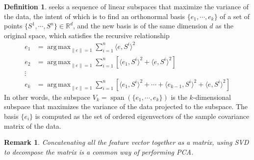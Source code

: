 \documentclass[a4paper]{article}
\theoremstyle{definition}
\newtheorem{definition}{Definition}
\theoremstyle{plain}
\newtheorem{remark}{Remark}
\DeclareMathOperator*{\argmax}{arg\,max}
\begin{document}
\begin{definition}
 seeks a sequence of linear subspaces that maximize the variance of the data, the intent of which is to find an orthonormal basis $\{e_1,\cdots,e_k\}$ of a set of points $\{S^1,\cdots,S^n\}\in\mathbb{R}^d$, and the new basis is of the same dimension $d$ as the original space, which satisfies the recursive relationship
\begin{align*}
    e_1&=\argmax_{\|e\|=1}\sum^n_{i=1}\langle e,S^i\rangle^2\\
    e_2&=\argmax_{\|e\|=1}\sum^n_{i=1}[\langle e_1,S^i\rangle^2+\langle e,S^i\rangle^2]\\
    \vdots\\
    e_k&=\argmax_{\|e\|=1}\sum^n_{i=1}[\langle e_1,S^i\rangle^2+\cdots+\langle e_{k-1},S^i\rangle^2+\langle e,S^i\rangle^2]
\end{align*}
In other words, the subspace $V_k=\operatorname{span}(\{e_1,\cdots,e_k\})$ is the $k$-dimensional subspace that maximizes the variance of the data projected to the subspace. The basis $\{e_i\}$ is computed as the set of ordered eigenvectors of the sample covariance matrix of the data.
\end{definition}

\begin{remark}
Concatenating all the feature vector together as a matrix, using SVD to decompose the matrix is a common way of performing PCA.
\end{remark}
\end{document}
